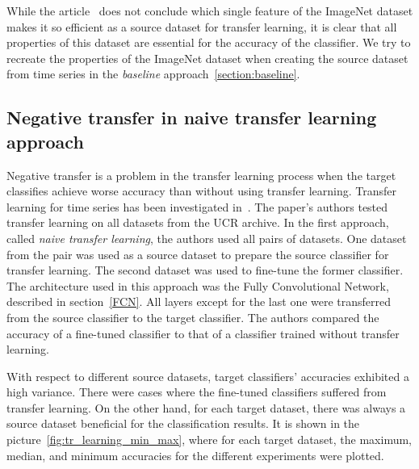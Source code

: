 \documentclass[a4paper,11pt,twoside]{report}
\theoremstyle{definition}
\begin{document}
While the article~\cite{imagnet} does not conclude which single feature of the ImageNet dataset makes it so efficient as a source dataset for transfer learning, it is clear that all properties of this dataset are essential for the accuracy of the classifier. We try to recreate the properties of the ImageNet dataset when creating the source dataset from time series in the \textit{baseline} approach~\ref{section:baseline}.



\subsection{Negative transfer in naive transfer learning approach}\label{Negative_transfer}
Negative transfer is a problem in the transfer learning process when the target classifies achieve worse accuracy than without using transfer learning. Transfer learning for time series has been investigated in~\cite{transfer_learning_time_series}. The paper's authors tested transfer learning on all datasets from the UCR archive. In the first approach, called \textit{naive transfer learning}, the authors used all pairs of datasets. One dataset from the pair was used as a source dataset to prepare the source classifier for transfer learning. The second dataset was used to fine-tune the former classifier. The architecture used in this approach was the Fully Convolutional Network, described in section~\ref{FCN}.  All layers except for the last one were transferred from the source classifier to the target classifier. The authors compared the accuracy of a fine-tuned classifier to that of a classifier trained without transfer learning.

With respect to different source datasets, target classifiers' accuracies exhibited a high variance. There were cases where the fine-tuned classifiers suffered from transfer learning. On the other hand, for each target dataset, there was always a source dataset beneficial for the classification results. It is shown in the picture~\ref{fig:tr_learning_min_max}, where for each target dataset, the maximum, median, and minimum accuracies for the different experiments were plotted.

\FloatBarrier
\end{document}

